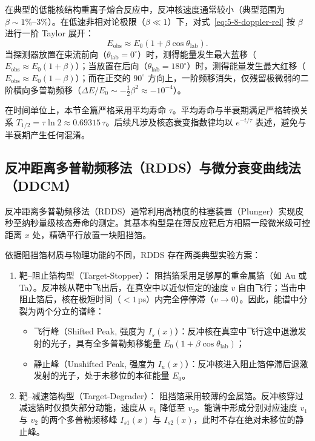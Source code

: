 在典型的低能核结构重离子熔合反应中，反冲核速度通常较小（典型范围为 $\beta \sim 1\%$–$3\%$）。在低速非相对论极限（$\beta \ll 1$）下，对式~\eqref{eq:5-8-doppler-rel} 按 $\beta$ 进行一阶 Taylor 展开：
\begin{equation}\label{eq:5-8-doppler-approx}
E_{\mathrm{obs}} \approx E_0 (1 + \beta \cos\theta_{\mathrm{lab}}).
\end{equation}
当探测器放置在束流前向（$\theta_{\mathrm{lab}} = 0^\circ$）时，测得能量发生最大蓝移（$E_{\mathrm{obs}} \approx E_0 (1 + \beta)$）；当放置在后向（$\theta_{\mathrm{lab}} = 180^\circ$）时，测得能量发生最大红移（$E_{\mathrm{obs}} \approx E_0 (1 - \beta)$）；而在正交的 $90^\circ$ 方向上，一阶频移消失，仅残留极微弱的二阶横向多普勒频移（$\Delta E / E_0 \sim -\frac{1}{2}\beta^2 \approx -10^{-4}$）。

在时间单位上，本节全篇严格采用平均寿命 $\tau$。平均寿命与半衰期满足严格转换关系 $T_{1/2} = \tau \ln 2 \approx 0.69315\,\tau$。后续凡涉及核态衰变指数律均以 $e^{-t/\tau}$ 表述，避免与半衰期产生任何混淆。

\subsection{反冲距离多普勒频移法（RDDS）与微分衰变曲线法（DDCM）}\label{subsec:5-8-2}

反冲距离多普勒频移法（RDDS）通常利用高精度的柱塞装置（Plunger）实现皮秒至纳秒量级核态寿命的测定。其基本构型是在薄反应靶后方相隔一段微米级可控距离 $x$ 处，精确平行放置一块阻挡箔。

依据阻挡箔材质与物理功能的不同，RDDS 存在两类典型实验方案：
\begin{enumerate}
\item 靶--阻止箔构型（Target-Stopper）：
阻挡箔采用足够厚的重金属箔（如 Au 或 Ta）。反冲核从靶中飞出后，在真空中以近似恒定的速度 $v$ 自由飞行；当击中阻止箔后，核在极短时间（$< 1\,\text{ps}$）内完全停停滞（$v \to 0$）。因此，能谱中分裂为两个分立的谱峰：
\begin{itemize}
\item 飞行峰（Shifted Peak, 强度为 $I_s(x)$）：反冲核在真空中飞行途中退激发射的光子，具有全多普勒频移能量 $E_0(1 + \beta \cos\theta_{\mathrm{lab}})$；
\item 静止峰（Unshifted Peak, 强度为 $I_u(x)$）：反冲核进入阻止箔停滞后退激发射的光子，处于未移位的本征能量 $E_0$。
\end{itemize}
\item 靶--减速箔构型（Target-Degrader）：
阻挡箔采用较薄的金属箔。反冲核穿过减速箔时仅损失部分动能，速度从 $v_1$ 降低至 $v_2$。能谱中形成分别对应速度 $v_1$ 与 $v_2$ 的两个多普勒频移峰 $I_{s1}(x)$ 与 $I_{s2}(x)$，此时不存在绝对未移位的静止峰。
\end{enumerate}

